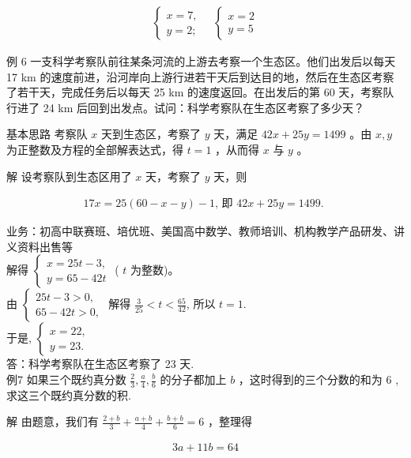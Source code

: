 \documentclass[10pt]{article}
\begin{document}
\begin{align*}
\left\{\begin{array} { l } 
{ x = 7 , } \\
{ y = 2 ; }
\end{array} \quad \left\{\begin{array}{l}
x=2 \\
y=5
\end{array}\right.\right.
\end{align*}

例 6 一支科学考察队前往某条河流的上游去考察一个生态区。他们出发后以每天 17 km 的速度前进，沿河岸向上游行进若干天后到达目的地，然后在生态区考察了若干天，完成任务后以每天 25 km 的速度返回。在出发后的第 60 天，考察队行进了 24 km 后回到出发点。试问：科学考察队在生态区考察了多少天？

基本思路 考察队 $x$ 天到生态区，考察了 $y$ 天，满足 $42 x+25 y=1499$ 。由 $x, y$ 为正整数及方程的全部解表达式，得 $t=1$ ，从而得 $x$ 与 $y$ 。

解 设考察队到生态区用了 $x$ 天，考察了 $y$ 天，则

\begin{align*}
17 x=25(60-x-y)-1 \text {, 即 } 42 x+25 y=1499 \text {. }
\end{align*}

业务：初高中联赛班、培优班、美国高中数学、教师培训、机构教学产品研发、讲义资料出售等\\
解得 $\left\{\begin{array}{l}x=25 t-3, \\ y=65-42 t\end{array}\right.$ ( $t$ 为整数)。\\
由 $\left\{\begin{array}{l}25 t-3>0, \\ 65-42 t>0,\end{array}\right.$ 解得 $\frac{3}{25}<t<\frac{65}{42}$, 所以 $t=1$.\\
于是, $\left\{\begin{array}{l}x=22, \\ y=23 .\end{array}\right.$\\
答：科学考察队在生态区考察了 23 天.\\
例7 如果三个既约真分数 $\frac{2}{3}, \frac{a}{4}, \frac{b}{6}$ 的分子都加上 $b$ ，这时得到的三个分数的和为 6 , 求这三个既约真分数的积.

解 由题意，我们有 $\frac{2+b}{3}+\frac{a+b}{4}+\frac{b+b}{6}=6$ ，整理得

\begin{align*}
3 a+11 b=64
\end{align*}
\end{document}
